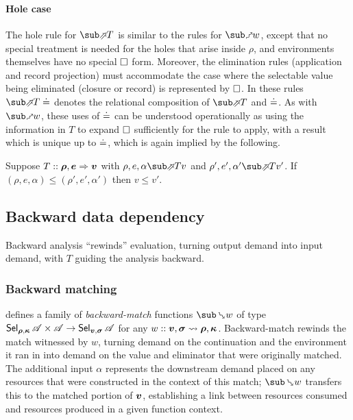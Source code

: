 \paragraph{Hole case} The hole rule for $\evalFwdF{T}$ is similar to the rules for $\matchFwdF{w}$, except that no special treatment is needed for the holes that arise inside $\rho$, and environments themselves have no special $\square$ form. Moreover, the elimination rules (application and record projection) must accommodate the case where the selectable value being eliminated (closure or record) is represented by $\square$. In these rules $\evalFwdR{T}\eq$ denotes the relational composition of $\evalFwdR{T}$ and $\doteq$. As with $\matchFwdF{w}$, these uses of $\doteq$ can be understood operationally as using the information in $T$ to expand $\square$ sufficiently for the rule to apply, with a result which is unique up to $\doteq$, which is again implied by the following.

\begin{lemma}
   Suppose $T :: \bm{\rho}, \bm{e} \Rightarrow \bm{v}$ with $\rho, e, \alpha \evalFwdR{T} v$ and $\rho', e', \alpha' \evalFwdR{T} v'$. If $(\rho, e, \alpha) \leq (\rho', e', \alpha')$ then $v \leq v'$.
\end{lemma}

\subsection{Backward data dependency}
\label{sec:data-dependencies:analyses:bwd}

Backward analysis ``rewinds'' evaluation, turning output demand into input demand, with $T$ guiding the analysis backward.

\subsubsection{Backward matching}
\label{sec:data-dependencies:analyses:bwd:pattern-match}

 defines a family of \emph{backward-match} functions $\matchBwdF{w}$ of type $\textup{\textsf{Sel}}_{\bm{\rho}, \bm{\kappa}}\,{\mathscr{A}} \times \mathscr{A} \to \textup{\textsf{Sel}}_{\bm{v}, \bm{\sigma}}\,{\mathscr{A}}$ for any $w :: \bm{v}, \bm{\sigma} \rightsquigarrow \bm{\rho}, \bm{\kappa}$. Backward-match rewinds the match witnessed by $w$, turning demand on the continuation and the environment it ran in into demand on the value and eliminator that were originally matched. The additional input $\alpha$ represents the downstream demand placed on any resources that were constructed in the context of this match; $\matchBwdF{w}$ transfers this to the matched portion of $\bm{v}$, establishing a link between resources consumed and resources produced in a given function context.

